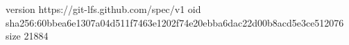 version https://git-lfs.github.com/spec/v1
oid sha256:60bbea6e1307a04d511f7463e1202f74e20ebba6dac22d00b8acd5e3ce512076
size 21884
